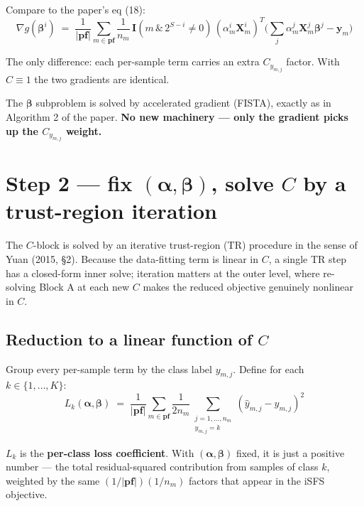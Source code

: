 \documentclass[11pt,a4paper]{article}
\begin{document}
Compare to the paper's eq (18):
\[
\nabla g(\boldsymbol{\beta}^{i}) \;=\; \frac{1}{|\mathbf{pf}|}\sum_{m \in \mathbf{pf}}\frac{1}{n_m}\,\mathbf{I}\!\left(m\,\&\,2^{S-i}\neq 0\right)\,(\alpha^{i}_{m}\mathbf{X}^{i}_{m})^{T}\!\Big(\sum_{j}\alpha^{j}_{m}\mathbf{X}^{j}_{m}\boldsymbol{\beta}^{j} - \mathbf{y}_m\Big)
\]

The only difference: each per-sample term carries an extra $C_{y_{m,j}}$ factor. With $C \equiv 1$ the two gradients are identical. \checkmark

The $\boldsymbol{\beta}$ subproblem is solved by accelerated gradient (FISTA), exactly as in Algorithm 2 of the paper. \textbf{No new machinery --- only the gradient picks up the $C_{y_{m,j}}$ weight.}

\section{Step 2 --- fix $(\boldsymbol{\alpha}, \boldsymbol{\beta})$, solve $C$ by a trust-region iteration}

The $C$-block is solved by an iterative trust-region (TR) procedure in the sense of Yuan (2015, \S 2). Because the data-fitting term is linear in $C$, a single TR step has a closed-form inner solve; iteration matters at the outer level, where re-solving Block A at each new $C$ makes the reduced objective genuinely nonlinear in $C$.

\subsection{Reduction to a linear function of $C$}

Group every per-sample term by the class label $y_{m,j}$. Define for each $k \in \{1, \ldots, K\}$:
\begin{equation}
\boxed{\;L_k(\boldsymbol{\alpha},\boldsymbol{\beta}) \;=\; \frac{1}{|\mathbf{pf}|}\sum_{m \in \mathbf{pf}}\frac{1}{2 n_m}\!\!\sum_{\substack{j=1,\ldots,n_m \\ y_{m,j} = k}}\!\!(\hat{y}_{m,j} - y_{m,j})^{2}\;}
\end{equation}

$L_k$ is the \textbf{per-class loss coefficient}. With $(\boldsymbol{\alpha}, \boldsymbol{\beta})$ fixed, it is just a positive number --- the total residual-squared contribution from samples of class $k$, weighted by the same $(1/|\mathbf{pf}|)(1/n_m)$ factors that appear in the iSFS objective.
\end{document}
